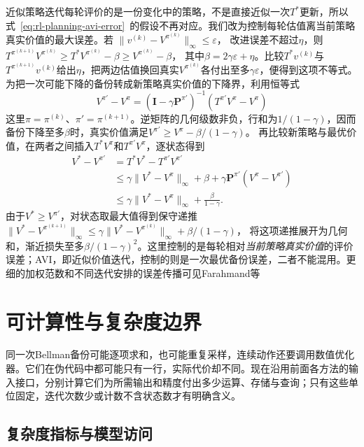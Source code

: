 近似策略迭代每轮评价的是一份变化中的策略，不是直接近似一次$T^*$更新，所以式~\eqref{eq:rl-planning-avi-error}~的假设不再对应。我们改为控制每轮估值离当前策略真实价值的最大误差。若
$\lVert v^{(k)}-V^{\pi^{(k)}}\rVert_\infty\leq\varepsilon$，
改进误差不超过$\eta$，则
$T^{\pi^{(k+1)}}V^{\pi^{(k)}}\geq T^*V^{\pi^{(k)}}-\beta
\geq V^{\pi^{(k)}}-\beta$，
其中$\beta=2\gamma\varepsilon+\eta$。比较$T^*v^{(k)}$与$T^{\pi^{(k+1)}}v^{(k)}$给出$\eta$，把两边估值换回真实$V^{\pi^{(k)}}$各付出至多$\gamma\varepsilon$，便得到这项不等式。
为把一次可能下降的备份转成新策略真实价值的下降界，利用恒等式
\[
 V^{\pi'}-V^\pi
 =(\bm I-\gamma\bm P^{\pi'})^{-1}(T^{\pi'}V^\pi-V^\pi)
\]
这里$\pi=\pi^{(k)}$、$\pi'=\pi^{(k+1)}$。逆矩阵的几何级数非负，行和为$1/(1-\gamma)$，因而备份下降至多$\beta$时，真实价值满足$V^{\pi'}\geq V^\pi-\beta/(1-\gamma)$。
再比较新策略与最优价值，在两者之间插入$T^*V^\pi$和$T^{\pi'}V^\pi$，逐状态得到
\[
\begin{aligned}
 V^*-V^{\pi'}
 &=T^*V^*-T^{\pi'}V^{\pi'}\\
 &\leq\gamma\lVert V^*-V^\pi\rVert_\infty
       +\beta+\gamma\bm P^{\pi'}(V^\pi-V^{\pi'})\\
 &\leq\gamma\lVert V^*-V^\pi\rVert_\infty+\frac{\beta}{1-\gamma}.
\end{aligned}
\]
由于$V^*\geq V^{\pi'}$，对状态取最大值得到保守递推
$\lVert V^*-V^{\pi^{(k+1)}}\rVert_\infty
\leq\gamma\lVert V^*-V^{\pi^{(k)}}\rVert_\infty+\beta/(1-\gamma)$，
将这项递推展开为几何和，渐近损失至多$\beta/(1-\gamma)^2$。这里控制的是每轮相对\emph{当前策略真实价值}的评价误差；AVI，即近似价值迭代，控制的则是一次最优备份误差，二者不能混用。更细的加权范数和不同迭代安排的误差传播可见Farahmand等

\section{可计算性与复杂度边界}
\label{sec:rl-planning-complexity}

同一次Bellman备份可能逐项求和，也可能重复采样，连续动作还要调用数值优化器。它们在伪代码中都可能只有一行，实际代价却不同。现在沿用前面各方法的输入接口，分别计算它们为所需输出和精度付出多少运算、存储与查询；只有这些单位固定，迭代次数少或计数不含状态数才有明确含义。

\subsection{复杂度指标与模型访问}
\label{sec:rl-planning-access-complexity}


